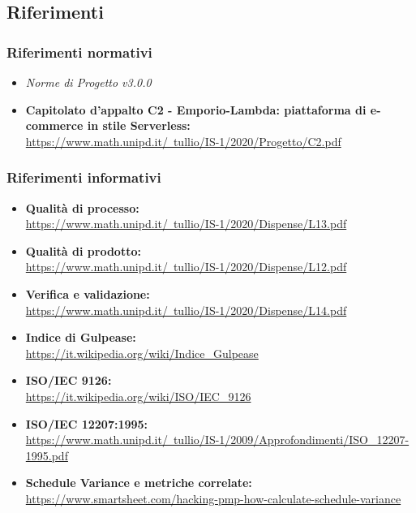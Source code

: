 \subsection{Riferimenti}
\subsubsection{Riferimenti normativi}
\begin{itemize}
    \item \textit{Norme di Progetto v3.0.0}
    \item \textbf{Capitolato d'appalto C2 - Emporio-Lambda: piattaforma di e-commerce in stile Serverless:} \\ \href{https://www.math.unipd.it/~tullio/IS-1/2020/Progetto/C2.pdf}{https://www.math.unipd.it/~tullio/IS-1/2020/Progetto/C2.pdf}
\end{itemize}
\subsubsection{Riferimenti informativi}
\begin{itemize}
    \item \textbf{Qualità di processo:} \\ \href{https://www.math.unipd.it/~tullio/IS-1/2020/Dispense/L13.pdf}{https://www.math.unipd.it/~tullio/IS-1/2020/Dispense/L13.pdf}
    \item \textbf{Qualità di prodotto:} \\ \href{https://www.math.unipd.it/~tullio/IS-1/2020/Dispense/L12.pdf}{https://www.math.unipd.it/~tullio/IS-1/2020/Dispense/L12.pdf}
    \item \textbf{Verifica e validazione:} \\ \href{https://www.math.unipd.it/~tullio/IS-1/2020/Dispense/L14.pdf}{https://www.math.unipd.it/~tullio/IS-1/2020/Dispense/L14.pdf}
    \item \textbf{Indice di Gulpease:} \\ \href{https://it.wikipedia.org/wiki/Indice\_Gulpease}{https://it.wikipedia.org/wiki/Indice\_Gulpease}
    \item \textbf{ISO/IEC 9126:} \\ \href{https://it.wikipedia.org/wiki/ISO/IEC\_9126}{https://it.wikipedia.org/wiki/ISO/IEC\_9126}
    \item \textbf{ISO/IEC 12207:1995:} \\ \href{https://www.math.unipd.it/~tullio/IS-1/2009/Approfondimenti/ISO\_12207-1995.pdf}{https://www.math.unipd.it/~tullio/IS-1/2009/Approfondimenti/ISO\_12207-1995.pdf}
    \item \textbf{Schedule Variance e metriche correlate:} \\ \href{https://www.smartsheet.com/hacking-pmp-how-calculate-schedule-variance}{https://www.smartsheet.com/hacking-pmp-how-calculate-schedule-variance}
\end{itemize}
\newpage